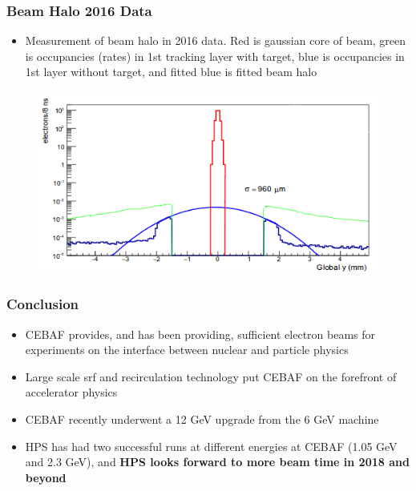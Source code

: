 \documentclass{beamer}
\begin{document}
\begin{frame}
\frametitle{Beam Halo 2016 Data}
\begin{itemize}
\item Measurement of beam halo in 2016 data. Red is gaussian core of beam, green is occupancies (rates) in 1st tracking layer with target, blue is occupancies in 1st layer without target, and fitted blue is fitted beam halo
\end{itemize}
\begin{figure}
\includegraphics[width=0.60\linewidth]{figs/beam_halo.png}
\end{figure}

\end{frame}


\begin{frame}
\frametitle{Conclusion}
\begin{itemize}
\item CEBAF provides, and has been providing, sufficient electron beams for experiments on the interface between nuclear and particle physics
\item Large scale srf and recirculation technology put CEBAF on the forefront of accelerator physics
\item CEBAF recently underwent a 12 GeV upgrade from the 6 GeV machine
\item HPS has had two successful runs at different energies at CEBAF (1.05 GeV and 2.3 GeV), and \textbf{HPS looks forward to more beam time in 2018 and beyond}
\end{itemize}

\end{frame}

\end{document}
